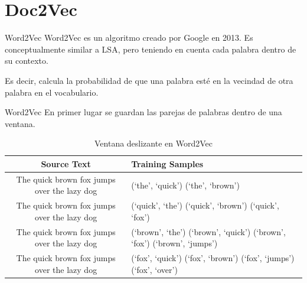 \documentclass{beamer}
\begin{document}
  \section{Doc2Vec}
  \begin{frame}{Word2Vec}
      Word2Vec es un algoritmo creado por Google en 2013. Es conceptualmente similar a LSA, pero teniendo en cuenta cada palabra dentro de su contexto.

      Es decir, calcula la probabilidad de que una palabra esté en la vecindad de otra palabra en el vocabulario.
  \end{frame}
  \begin{frame}{Word2Vec}
      En primer lugar se guardan las parejas de palabras dentro de una ventana.
      \tiny
      \begin{table}
          \centering
          \begin{tabular}{cp{45mm}}
              \toprule
              Source Text & Training Samples \\
              \midrule
              \colorbox{blue!20}{\colorbox{red!20}{The} quick brown} fox jumps over the lazy dog & (`the', `quick') \newline (`the', `brown') \\
              \midrule
              \colorbox{blue!20}{The \colorbox{red!20}{quick} brown fox} jumps over the lazy dog & (`quick', `the') \newline (`quick', `brown') \newline (`quick', `fox') \\
              \midrule
              \colorbox{blue!20}{The quick \colorbox{red!20}{brown} fox jumps} over the lazy dog & (`brown', `the') \newline (`brown', `quick') \newline (`brown', `fox') \newline (`brown', `jumps') \\
              \midrule
              The \colorbox{blue!20}{quick brown \colorbox{red!20}{fox} jumps over} the lazy dog & (`fox', `quick') \newline (`fox', `brown') \newline (`fox', `jumps') \newline (`fox', `over') \\
              \bottomrule
          \end{tabular}
          \caption{Ventana deslizante en Word2Vec}\label{tab:w2v-window}
      \end{table}
  \end{frame}
\end{document}
